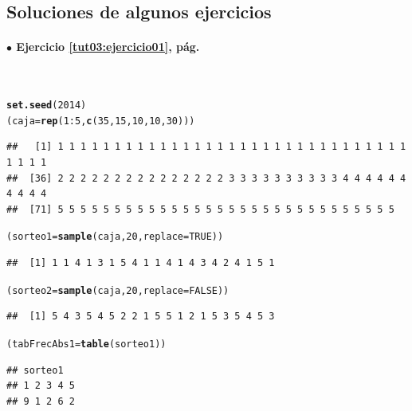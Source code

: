 \documentclass[10pt,a4paper]{article}\usepackage[]{graphicx}\usepackage[]{color}
\makeatletter
\newcommand{\hlnum}[1]{\textcolor[rgb]{0.686,0.059,0.569}{#1}}%
\newcommand{\hlopt}[1]{\textcolor[rgb]{0,0,0}{#1}}%
\newcommand{\hlstd}[1]{\textcolor[rgb]{0.345,0.345,0.345}{#1}}%
\newcommand{\hlkwb}[1]{\textcolor[rgb]{0.69,0.353,0.396}{#1}}%
\newcommand{\hlkwc}[1]{\textcolor[rgb]{0.333,0.667,0.333}{#1}}%
\newcommand{\hlkwd}[1]{\textcolor[rgb]{0.737,0.353,0.396}{\textbf{#1}}}%
\newenvironment{kframe}{%
 \def\at@end@of@kframe{}%
 \ifinner\ifhmode%
  \def\at@end@of@kframe{\end{minipage}}%
  \begin{minipage}{\columnwidth}%
 \fi\fi%
 \def\FrameCommand##1{\hskip\@totalleftmargin \hskip-\fboxsep
 \colorbox{shadecolor}{##1}\hskip-\fboxsep
     \hskip-\linewidth \hskip-\@totalleftmargin \hskip\columnwidth}%
 \MakeFramed {\advance\hsize-\width
   \@totalleftmargin\z@ \linewidth\hsize
   \@setminipage}}%
 {\par\unskip\endMakeFramed%
 \at@end@of@kframe}
\newenvironment{knitrout}{}{} %
\makeatother
\begin{document}
\subsection*{Soluciones de algunos ejercicios}

\paragraph{\bf $\bullet$ Ejercicio \ref{tut03:ejercicio01}, pág. \pageref{tut03:ejercicio01}}
\label{tut03:ejercicio01:sol}\quad\\

\begin{knitrout}
\color{fgcolor}\begin{kframe}
\begin{alltt}
\hlkwd{set.seed}\hlstd{(}\hlnum{2014}\hlstd{)}
\hlstd{(caja}\hlkwb{=}\hlkwd{rep}\hlstd{(} \hlnum{1}\hlopt{:}\hlnum{5}\hlstd{,} \hlkwd{c}\hlstd{(}\hlnum{35}\hlstd{,} \hlnum{15}\hlstd{,} \hlnum{10}\hlstd{,} \hlnum{10}\hlstd{,} \hlnum{30}\hlstd{) ))}
\end{alltt}
\begin{verbatim}
##   [1] 1 1 1 1 1 1 1 1 1 1 1 1 1 1 1 1 1 1 1 1 1 1 1 1 1 1 1 1 1 1 1 1 1 1 1
##  [36] 2 2 2 2 2 2 2 2 2 2 2 2 2 2 2 3 3 3 3 3 3 3 3 3 3 4 4 4 4 4 4 4 4 4 4
##  [71] 5 5 5 5 5 5 5 5 5 5 5 5 5 5 5 5 5 5 5 5 5 5 5 5 5 5 5 5 5 5
\end{verbatim}
\begin{alltt}
\hlstd{(sorteo1} \hlkwb{=} \hlkwd{sample}\hlstd{(caja,} \hlnum{20}\hlstd{,} \hlkwc{replace} \hlstd{=} \hlnum{TRUE}\hlstd{))}
\end{alltt}
\begin{verbatim}
##  [1] 1 1 4 1 3 1 5 4 1 1 4 1 4 3 4 2 4 1 5 1
\end{verbatim}
\begin{alltt}
\hlstd{(sorteo2} \hlkwb{=} \hlkwd{sample}\hlstd{(caja,} \hlnum{20}\hlstd{,} \hlkwc{replace} \hlstd{=} \hlnum{FALSE}\hlstd{))}
\end{alltt}
\begin{verbatim}
##  [1] 5 4 3 5 4 5 2 2 1 5 5 1 2 1 5 3 5 4 5 3
\end{verbatim}
\begin{alltt}
\hlstd{(tabFrecAbs1}  \hlkwb{=} \hlkwd{table}\hlstd{(sorteo1))}
\end{alltt}
\begin{verbatim}
## sorteo1
## 1 2 3 4 5 
## 9 1 2 6 2
\end{verbatim}
\begin{alltt}

\end{alltt}
\end{kframe}
\end{knitrout}
\end{document}
